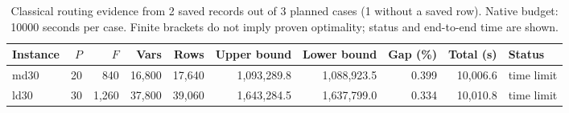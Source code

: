 \begin{table}[htbp]
\centering\scriptsize
\setlength{\tabcolsep}{3pt}
\caption{Classical routing evidence from 2 saved records out of 3 planned cases (1 without a saved row). Native budget: 10000 seconds per case. Finite brackets do not imply proven optimality; status and end-to-end time are shown.}
\label{tab:khaled_30day_classical}
\begin{tabular}{lrrrrrrrrl}
\toprule
Instance & $P$ & $F$ & Vars & Rows & Upper bound & Lower bound & Gap (\%) & Total (s) & Status \\
\midrule
md30 & 20 & 840 & 16,800 & 17,640 & 1,093,289.8 & 1,088,923.5 & 0.399 & 10,006.6 & time limit \\
ld30 & 30 & 1,260 & 37,800 & 39,060 & 1,643,284.5 & 1,637,799.0 & 0.334 & 10,010.8 & time limit \\
\bottomrule
\end{tabular}
\end{table}
